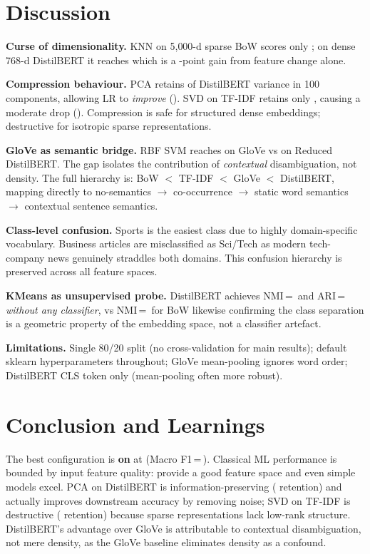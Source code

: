 \documentclass[11pt,a4paper]{article}
\begin{document}
\section{Discussion}

\textbf{Curse of dimensionality.}
KNN on 5{,}000-d sparse BoW scores only \knnBoWAcc{}; on dense 768-d DistilBERT it reaches
\knnBertAcc{} which is a \knnJumpPP{}-point gain from feature change alone.

\textbf{Compression behaviour.}
PCA retains \bertPcaVar{} of DistilBERT variance in 100 components, allowing LR to
\textit{improve} (\lrBertImprove). SVD on TF-IDF retains only \tfidfSvdVar{}, causing a moderate
drop (\lrTfidfDrop). Compression is safe for structured dense embeddings; destructive for
isotropic sparse representations.

\textbf{GloVe as semantic bridge.}
RBF SVM reaches \gloveRbfAcc{} on GloVe vs \rbfBertPcaAcc{} on Reduced DistilBERT.
The gap isolates the contribution of \textit{contextual} disambiguation, not density.
The full hierarchy is: BoW $<$ TF-IDF $<$ GloVe $<$ DistilBERT, mapping directly to
no-semantics $\to$ co-occurrence $\to$ static word semantics $\to$ contextual sentence semantics.

\textbf{Class-level confusion.}
Sports is the easiest class due to highly domain-specific vocabulary. \cmBizToSci{} Business
articles are misclassified as Sci/Tech as modern tech-company news genuinely straddles both
domains. This confusion hierarchy is preserved across all feature spaces.

\textbf{KMeans as unsupervised probe.}
DistilBERT achieves NMI\,=\,\kmBertNmi{} and ARI\,=\,\kmBertAri{} \textit{without any classifier},
vs NMI\,=\,\kmBowNmi{} for BoW likewise confirming the class separation is a geometric property of
the embedding space, not a classifier artefact.

\textbf{Limitations.}
Single 80/20 split (no cross-validation for main results); default sklearn hyperparameters
throughout; GloVe mean-pooling ignores word order; DistilBERT CLS token only (mean-pooling
often more robust).

\section{Conclusion and Learnings}

The best configuration is \textbf{\bestModel{} on \bestFeat{}} at \textbf{\bestAcc{}}
(Macro F1\,=\,\bestFscore{}). Classical ML performance is bounded by input feature quality:
provide a good feature space and even simple models excel. PCA on DistilBERT is
information-preserving (\bertPcaVar{} retention) and actually improves downstream accuracy
by removing noise; SVD on TF-IDF is destructive (\tfidfSvdVar{} retention) because sparse
representations lack low-rank structure. DistilBERT's advantage over GloVe is attributable
to contextual disambiguation, not mere density, as the GloVe baseline eliminates density
as a confound.
\end{document}
